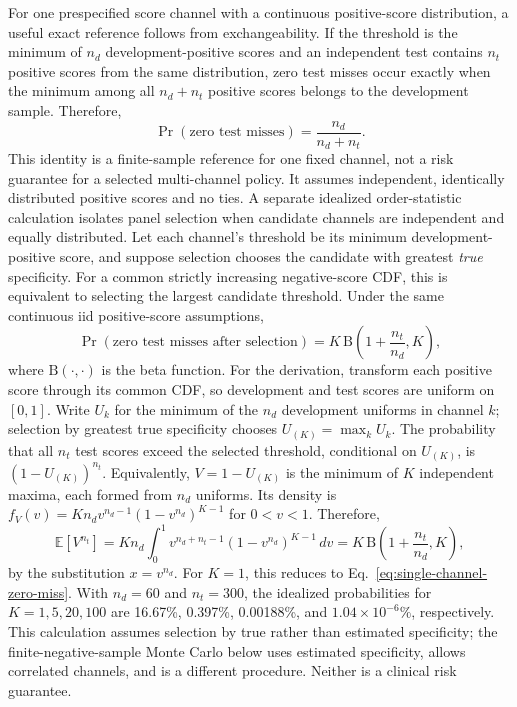 \documentclass{ieeeaccess}
\begin{document}
For one prespecified score channel with a continuous positive-score distribution, a useful exact reference follows from exchangeability. If the threshold is the minimum of $n_d$ development-positive scores and an independent test contains $n_t$ positive scores from the same distribution, zero test misses occur exactly when the minimum among all $n_d+n_t$ positive scores belongs to the development sample. Therefore,
\begin{equation}
\Pr(\text{zero test misses})=\frac{n_d}{n_d+n_t}.
\label{eq:single-channel-zero-miss}
\end{equation}
This identity is a finite-sample reference for one fixed channel, not a risk guarantee for a selected multi-channel policy. It assumes independent, identically distributed positive scores and no ties. A separate idealized order-statistic calculation isolates panel selection when candidate channels are independent and equally distributed. Let each channel's threshold be its minimum development-positive score, and suppose selection chooses the candidate with greatest \emph{true} specificity. For a common strictly increasing negative-score CDF, this is equivalent to selecting the largest candidate threshold. Under the same continuous iid positive-score assumptions,
\begin{equation}
\Pr(\text{zero test misses after selection})=K\,\mathrm{B}\!\left(1+\frac{n_t}{n_d},K\right),
\label{eq:panel-zero-miss}
\end{equation}
where $\mathrm{B}(\cdot,\cdot)$ is the beta function. For the derivation, transform each positive score through its common CDF, so development and test scores are uniform on $[0,1]$. Write $U_k$ for the minimum of the $n_d$ development uniforms in channel $k$; selection by greatest true specificity chooses $U_{(K)}=\max_k U_k$. The probability that all $n_t$ test scores exceed the selected threshold, conditional on $U_{(K)}$, is $(1-U_{(K)})^{n_t}$. Equivalently, $V=1-U_{(K)}$ is the minimum of $K$ independent maxima, each formed from $n_d$ uniforms. Its density is $f_V(v)=K n_d v^{n_d-1}(1-v^{n_d})^{K-1}$ for $0<v<1$. Therefore,
\begin{equation*}
\mathbb{E}[V^{n_t}]=K n_d\int_0^1 v^{n_d+n_t-1}(1-v^{n_d})^{K-1}\,dv
=K\,\mathrm{B}\!\left(1+\frac{n_t}{n_d},K\right),
\end{equation*}
by the substitution $x=v^{n_d}$. For $K=1$, this reduces to Eq.~\eqref{eq:single-channel-zero-miss}. With $n_d=60$ and $n_t=300$, the idealized probabilities for $K=1,5,20,100$ are 16.67\%, 0.397\%, 0.00188\%, and $1.04\times10^{-6}\%$, respectively. This calculation assumes selection by true rather than estimated specificity; the finite-negative-sample Monte Carlo below uses estimated specificity, allows correlated channels, and is a different procedure. Neither is a clinical risk guarantee.
\end{document}
